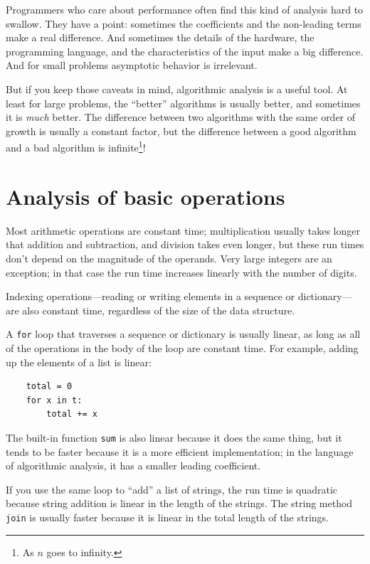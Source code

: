 \documentclass[10pt]{book}
\begin{document}
Programmers who care about performance often find this kind of
analysis hard to swallow.  They have a point: sometimes the
coefficients and the non-leading terms make a real difference.  And
sometimes the details of the hardware, the programming language, and
the characteristics of the input make a big difference.  And for small
problems asymptotic behavior is irrelevant.

But if you keep those caveats in mind, algorithmic analysis is a
useful tool.  At least for large problems, the ``better'' algorithms
is usually better, and sometimes it is {\em much} better.  The
difference between two algorithms with the same order of growth is
usually a constant factor, but the difference between a good algorithm
and a bad algorithm is infinite\footnote{As $n$ goes to infinity.}!


\section{Analysis of basic operations}

Most arithmetic operations are constant time; multiplication
usually takes longer that addition and subtraction, and division
takes even longer, but these run times don't
depend on the magnitude of the operands.  Very large integers
are an exception; in that case the run time increases linearly
with the number of digits.

Indexing operations---reading or writing elements in a sequence
or dictionary---are also constant time, regardless of the size
of the data structure.

A {\tt for} loop that traverses a sequence or dictionary is
usually linear, as long as all of the operations in the body
of the loop are constant time.  For example, adding up the
elements of a list is linear:

\begin{verbatim}
    total = 0
    for x in t:
        total += x
\end{verbatim}

The built-in function {\tt sum} is also linear because it does
the same thing, but it tends to be faster because it is a more
efficient implementation; in the language of algorithmic analysis,
it has a smaller leading coefficient.

If you use the same loop to ``add'' a list of strings, the
run time is quadratic
because string addition is linear in the length of the strings.
The string method {\tt join} is usually faster because it is
linear in the total length of the strings.
\end{document}

